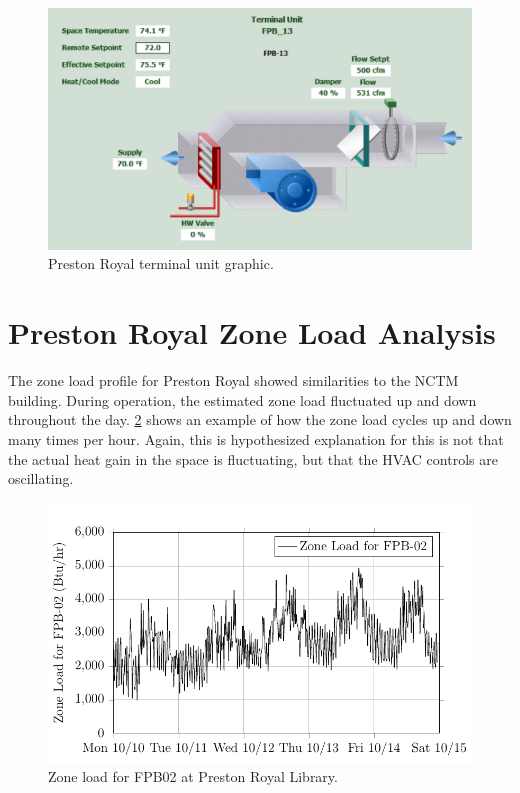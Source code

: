 \begin{figure}
\centering
\includegraphics[width=\textwidth]{Images/PrestonRoyalTerminalUnitGraphic.PNG}
\caption{Preston Royal terminal unit graphic. }
\label{fig:PrestonRoyalTerminalUnitGraphic}
\end{figure}



\section{Preston Royal Zone Load Analysis}

The zone load profile for Preston Royal showed similarities to the NCTM
building. During operation, the estimated zone load fluctuated up and
down throughout the day. \figref{}
\ref{fig:2017-04-03-1250-ZoneLoadforFPB02-TikzData} shows an example of
how the zone load cycles up and down many times per hour. Again, this is
hypothesized explanation for this is not that the actual heat gain in
the space is fluctuating, but that the HVAC controls are oscillating. 

\begin{figure}
\centering
\includegraphics[]{Plots/2017-04-03-1250-ZoneLoadforFPB02-TikzData.pdf}
\caption{Zone load for FPB02 at Preston Royal Library.}
\label{fig:2017-04-03-1250-ZoneLoadforFPB02-TikzData}
\end{figure}
